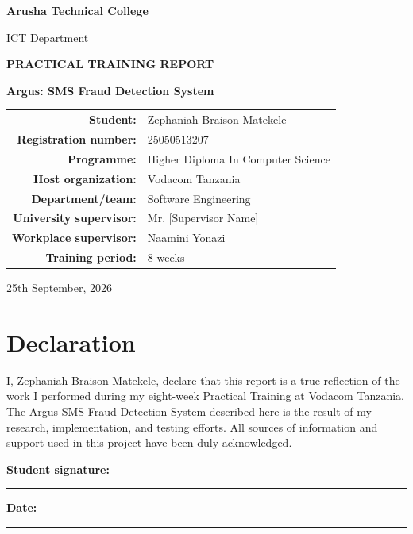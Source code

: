 \documentclass[12pt,a4paper,oneside]{report}
\newcommand{\UniversityName}{Arusha Technical College}
\newcommand{\DepartmentName}{ICT Department}
\newcommand{\ProgrammeName}{Higher Diploma In Computer Science}
\newcommand{\StudentName}{Zephaniah Braison Matekele}
\newcommand{\RegistrationNumber}{25050513207}
\newcommand{\HostOrganization}{Vodacom Tanzania}
\newcommand{\HostDepartment}{Software Engineering}
\newcommand{\FacultyName}{}
\newcommand{\ProjectSubtitle}{}
\newcommand{\UniversitySupervisor}{Mr. [Supervisor Name]}
\newcommand{\WorkplaceSupervisor}{Naamini Yonazi}
\newcommand{\TrainingPeriod}{8 weeks}
\newcommand{\SubmissionDate}{25th September, 2026}
\newcommand{\ProjectTitle}{Argus: SMS Fraud Detection System}
\newcommand{\ProjectSubtitle}{A Practical Training Project at Vodacom Tanzania}
\begin{document}
\begin{titlepage}
  \centering
  \vspace*{10mm}
  {\Large\bfseries \UniversityName\par}
  \vspace{4mm}
  {\large \FacultyName\par}
  {\large \DepartmentName\par}
  \vspace{15mm}
  {\Large\bfseries PRACTICAL TRAINING REPORT\par}
  \vspace{12mm}
  {\huge\bfseries \ProjectTitle\par}
  \vspace{4mm}
  {\large \ProjectSubtitle\par}
  \vfill
  \begin{tabular}{rl}
    \textbf{Student:} & \StudentName\\
    \textbf{Registration number:} & \RegistrationNumber\\
    \textbf{Programme:} & \ProgrammeName\\
    \textbf{Host organization:} & \HostOrganization\\
    \textbf{Department/team:} & \HostDepartment\\
    \textbf{University supervisor:} & \UniversitySupervisor\\
    \textbf{Workplace supervisor:} & \WorkplaceSupervisor\\
    \textbf{Training period:} & \TrainingPeriod\\
  \end{tabular}
  \vfill
  {\large \SubmissionDate\par}
\end{titlepage}


\chapter*{Declaration}
I, \StudentName, declare that this report is a true reflection of the work I performed during my eight-week Practical Training at Vodacom Tanzania. The Argus SMS Fraud Detection System described here is the result of my research, implementation, and testing efforts. All sources of information and support used in this project have been duly acknowledged.

\vspace{15mm}
\noindent\textbf{Student signature:} \rule{55mm}{0.4pt}\hfill
\textbf{Date:} \rule{30mm}{0.4pt}
\end{document}
